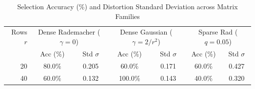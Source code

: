 \begin{table}[htbp]
\centering
\small
\caption{Selection Accuracy (\%) and Distortion Standard Deviation across Matrix Families}
\label{tab:matrix_families}
\begin{tabular}{r|cc|cc|cc}
\toprule
Rows $r$ & \multicolumn{2}{c}{Dense Rademacher ($\gamma=0$)} & \multicolumn{2}{c}{Dense Gaussian ($\gamma=2/r^2$)} & \multicolumn{2}{c}{Sparse Rad ($q=0.05$)} \\
 & Acc (\%) & Std $\sigma$ & Acc (\%) & Std $\sigma$ & Acc (\%) & Std $\sigma$ \\
\midrule
 20 &  80.0\% & 0.205 &  60.0\% & 0.171 &  60.0\% & 0.427 \\
 40 &  60.0\% & 0.132 & 100.0\% & 0.143 &  40.0\% & 0.320 \\
\bottomrule
\end{tabular}
\end{table}
